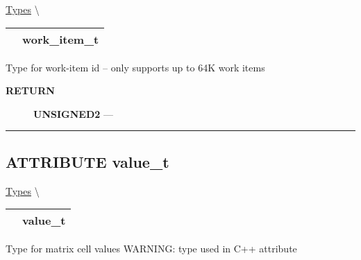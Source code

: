\hypertarget{ecldoc:pbblas.types.work_item_t}{}
\hspace{0pt} \hyperlink{ecldoc:PBblas.Types}{Types} \textbackslash 

{\renewcommand{\arraystretch}{1.5}
\begin{tabularx}{\textwidth}{|>{\raggedright\arraybackslash}l|X|}
\hline
\hspace{0pt}\mytexttt{\color{red} } & \textbf{work\_item\_t} \\
\hline
\end{tabularx}
}

\par





Type for work-item id -- only supports up to 64K work items








\par
\begin{description}
\item [\colorbox{tagtype}{\color{white} \textbf{\textsf{RETURN}}}] \textbf{UNSIGNED2} --- 
\end{description}




\rule{\linewidth}{0.5pt}
\subsection*{\textsf{\colorbox{headtoc}{\color{white} ATTRIBUTE}
value\_t}}

\hypertarget{ecldoc:pbblas.types.value_t}{}
\hspace{0pt} \hyperlink{ecldoc:PBblas.Types}{Types} \textbackslash 

{\renewcommand{\arraystretch}{1.5}
\begin{tabularx}{\textwidth}{|>{\raggedright\arraybackslash}l|X|}
\hline
\hspace{0pt}\mytexttt{\color{red} } & \textbf{value\_t} \\
\hline
\end{tabularx}
}

\par





Type for matrix cell values WARNING: type used in C++ attribute








